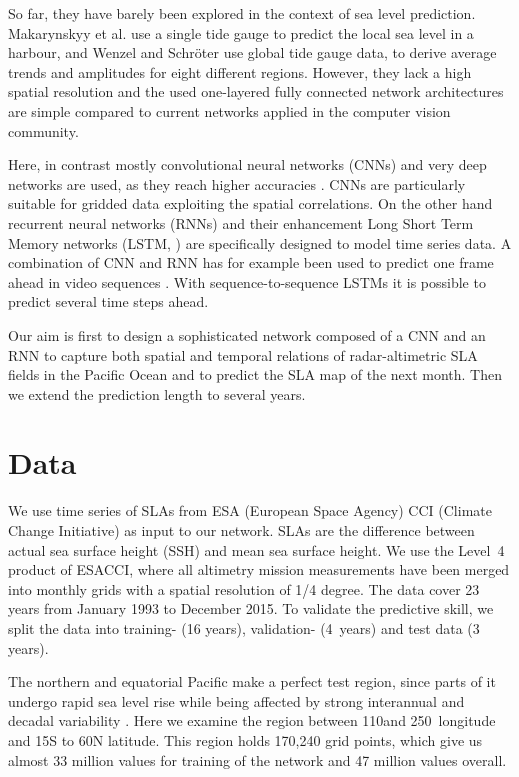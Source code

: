 \documentclass{article}
\begin{document}
So far, they have barely been explored in the context of sea level prediction. 
Makarynskyy et al. \cite{harbor} use a single tide gauge to predict the local sea level in a harbour, and Wenzel and Schr\"oter \cite{c10} use global tide gauge data, to derive average trends and amplitudes for eight different regions. However, they lack a high spatial resolution and the used one-layered fully connected network architectures are simple compared to current networks applied in the computer vision community. 
 
Here, in contrast mostly convolutional neural networks (CNNs) and very deep networks are used, as they reach higher accuracies \cite{c22}. CNNs are particularly suitable for gridded data exploiting the spatial correlations. On the other hand recurrent neural networks (RNNs) and their enhancement Long Short Term Memory networks (LSTM, \cite{c11}) are specifically designed to model time series data. A combination of CNN and RNN has for example been used to predict one frame ahead in video sequences \cite{s18}. With sequence-to-sequence LSTMs \cite{s23} it is possible to predict several time steps ahead. 

Our aim is first to design a sophisticated network composed of a CNN and an RNN to capture both spatial and temporal relations of radar-altimetric SLA fields in the Pacific Ocean and to predict the SLA map of the next month. Then we extend the prediction length to several years.

\section{Data}
\label{sec:pagestyle}

We use time series of SLAs from ESA (European Space \linebreak Agency) CCI (Climate Change Initiative) \cite{c1} as input to our network. SLAs are the difference between actual sea surface height (SSH) and mean sea surface height. We use the Level~4 product of ESACCI, where all altimetry mission measurements have been merged into monthly grids with a spatial resolution of 1/4 degree. The data cover 23 years from \mbox{January} 1993 to December 2015. To validate the predictive skill, we split the data into training- (16 years), validation- (4~years) and test data (3 years). 

The northern and equatorial Pacific make a perfect test region, since parts of it undergo rapid sea level rise while being affected by strong interannual and decadal variability \cite{riet}. Here we examine the region between 110\degree and 250\degree ~longitude and 15\degree S to 60\degree N latitude. 
This region holds 170,240 grid points, which give us almost 33 million values for training of the network and 47 million values overall.
\end{document}

